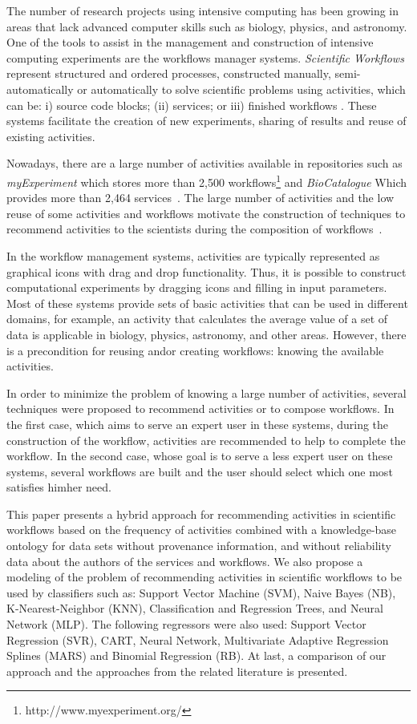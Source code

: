 \documentclass[10pt,letterpaper]{article}
\begin{document}
The number of research projects using intensive computing has been growing in areas that lack advanced computer skills such as biology, physics, and astronomy. One of the tools to assist in the management and construction of intensive computing experiments are the workflows manager systems. \emph{Scientific Workflows} represent structured and ordered processes, constructed manually, semi-automatically or automatically to solve scientific problems using activities, which can be: i) source code blocks; (ii) services; or iii) finished workflows \cite{Wang2010}. These systems facilitate the creation of new experiments, sharing of results and reuse of existing activities.

Nowadays, there are a large number of activities available in repositories such as \emph{myExperiment} which stores more than 2,500 workflows\footnote{http://www.myexperiment.org/} and \emph{BioCatalogue} Which provides more than 2,464 services~\cite{Biocatalogue}. The large number of activities and the low reuse of some activities and workflows motivate the construction of techniques to recommend activities to the scientists during the composition of workflows~\cite{Wang2010}.

In the workflow management systems, activities are typically represented as graphical icons with drag and drop functionality. Thus, it is possible to construct computational experiments by dragging icons and filling in input parameters. Most of these systems provide sets of basic activities that can be used in different domains, for example, an activity that calculates the average value of a set of data is applicable in biology, physics, astronomy, and other areas. However, there is a precondition for reusing and\/or creating workflows: knowing the available activities.

In order to minimize the problem of knowing a large number of activities, several techniques were proposed to recommend activities or to compose workflows. In the first case, which aims to serve an expert user in these systems, during the construction of the workflow, activities are recommended to help to complete the workflow. In the second case, whose goal is to serve a less expert user on these systems, several workflows are built and the user should select which one most satisfies him\/her need.

This paper presents a hybrid approach for recommending activities in scientific workflows based on the frequency of activities combined with a knowledge-base ontology for data sets without provenance information, and without reliability data about the authors of the services and workflows. We also propose a modeling of the problem of recommending activities in scientific workflows to be used by classifiers such as: Support Vector Machine (SVM), Naive Bayes (NB), K-Nearest-Neighbor (KNN), Classification and Regression Trees, and Neural Network (MLP). The following regressors were also used: Support Vector Regression (SVR), CART, Neural Network, Multivariate Adaptive Regression Splines (MARS) and Binomial Regression (RB). At last, a comparison of our approach and the approaches from the related literature is presented.
\end{document}
